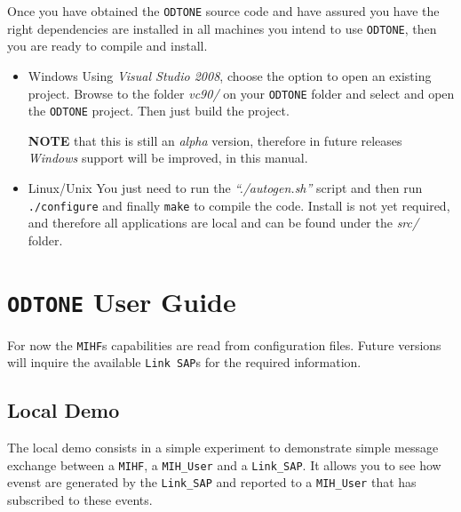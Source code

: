 \documentclass[11pt]{article}
\begin{document}
Once you have obtained the \texttt{ODTONE} source code and have assured you have the
right dependencies are installed in all machines you intend to use \texttt{ODTONE},
then you are ready to compile and install.

\begin{itemize}
\item	Windows
	\subitem	Using \textit{Visual Studio 2008}, choose the option to open an
existing project. Browse to the folder \textit{vc90/} on your \texttt{ODTONE} folder and
select and open the \texttt{ODTONE} project. Then just build the project.

\textbf{NOTE} that this is still an \textit{alpha} version, therefore in future releases \textit{Windows}
support will be improved, in this manual.

\item	Linux/Unix
	\subitem	You just need to run the \textit{``./autogen.sh''} script and
    then run \texttt{./configure} and finally \texttt{make} to compile the code. Install is not yet required, and therefore
all applications are local and can be found under the \textit{src/} folder.


\end{itemize}



















\newpage
\section{\texttt{ODTONE} User Guide}
\label{sec-2}

   For now the \texttt{MIHF}s capabilities are read from configuration
   files. Future versions will inquire the available \texttt{Link SAP}s for the
   required information.


\subsection{Local Demo}
\label{sec-2.1}

The local demo consists in a simple experiment to demonstrate simple message
exchange between a \texttt{MIHF}, a \texttt{MIH\_User} and a \texttt{Link\_SAP}.
It allows you to see how evenst are generated by the \texttt{Link\_SAP} and
reported to a \texttt{MIH\_User} that has subscribed to these events.
\end{document}
